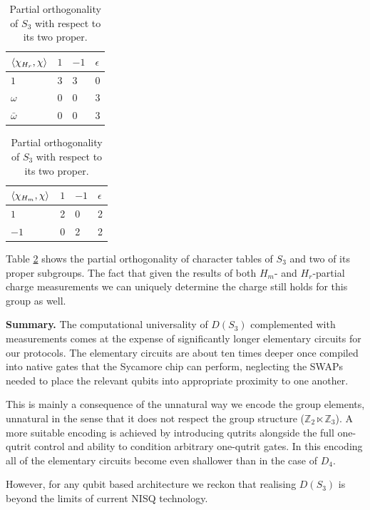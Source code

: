 \documentclass[two column]{article}
\begin{document}
\begin{table}[h]
\centering
\begin{tabular}{|l|lll|}\hline
  $\braket{\chi_{H_r}, \chi}$ & $1$ & $-1$ & $\epsilon$  \\ \hline
$1$ & 3   & 3            & 0                             \\ 
$\omega$ & 0   & 0            & 3                              \\ 
$\bar{\omega}$ & 0   & 0            & 3                          \\ \hline
\end{tabular}

\begin{tabular}{|l|lll|}\hline
  $\braket{\chi_{H_m}, \chi}$ & $1$ & $-1$ & $\epsilon$  \\ \hline
$1$ & 2   & 0            & 2                             \\ 
$-1$ & 0   & 2            & 2                              \\ \hline

\end{tabular}
\caption{Partial orthogonality of $S_3$ with respect to its two proper.}
\label{tab:red_ch_S3}
\end{table}

Table \ref{tab:red_ch_S3} shows the partial orthogonality of character tables of $S_3$ and two of its proper subgroups. The fact that given the results of both $H_m$- and $H_r$-partial charge measurements we can uniquely determine the charge still holds for this group as well. 

\textbf{Summary.}
The computational universality of $D(S_3)$ complemented with measurements comes at the expense of significantly longer elementary circuits for our protocols. The elementary circuits are about ten times deeper once compiled into native gates that the Sycamore chip can perform, neglecting the SWAPs needed to place the relevant qubits into appropriate proximity to one another.

This is mainly a consequence of the unnatural way we encode the group elements, unnatural in the sense that it does not respect the group structure ($\mathbb{Z}_2 \ltimes \mathbb{Z}_3$). A more suitable encoding is achieved by introducing qutrits alongside the full one-qutrit control and ability to condition arbitrary one-qutrit gates. In this encoding all of the elementary circuits become even shallower than in the case of $D_4$. 

However, for any qubit based architecture we reckon that realising $D(S_3)$ is beyond the limits of current NISQ technology.
\end{document}
